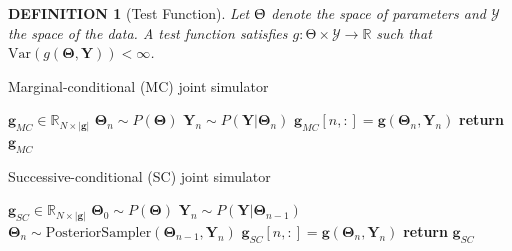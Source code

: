 \documentclass[a4paper,12pt]{article}
\newtheorem{definition}[theorem]{DEFINITION}
\newcommand{\var}{\mathrm{Var}}
\begin{document}
\begin{definition}[Test Function]
    Let $\mathbf{\Uptheta}$ denote the space of parameters and $\mathcal{Y}$ the space of the data. A test function satisfies $g:\mathrm{\Theta} \times \mathcal{Y} \rightarrow \mathbb{R}$ such that $\var(g(\mathbf{\Theta}, \mathbf{Y})) < \infty$. 
\end{definition}

\begin{algorithm}
    \centering
    \caption{Marginal-conditional (MC) joint simulator}\label{alg:mc-sampler}
    \begin{algorithmic}[1]
        \State {} $\mathbf{g}_{MC} \in \mathbb{R}_{N\times |\mathbf{g}|}$
            \State $\mathbf{\Theta}_{n} \sim P(\mathbf{\Theta})$ 
            \State $\mathbf{Y}_{n} \sim P(\mathbf{Y}|\mathbf{\Theta}_{n})$ 
            \State $\mathbf{g}_{MC}[n, :] = \mathbf{g}(\mathbf{\Theta}_{n}, \mathbf{Y}_{n})$ 
        \EndFor        
        \State \textbf{return} $\mathbf{g}_{MC}$
    \end{algorithmic}
\end{algorithm}

\begin{algorithm}
    \centering
    \caption{Successive-conditional (SC) joint simulator}\label{alg:sc-sampler}
    \begin{algorithmic}[1]
        \State {} $\mathbf{g}_{SC} \in \mathbb{R}_{N\times |\mathbf{g}|}$
        \State $\mathbf{\Theta}_{0} \sim P(\mathbf{\Theta})$ 
            \State $\mathbf{Y}_{n} \sim P(\mathbf{Y}|\mathbf{\Theta}_{n-1})$ 
            \State $\mathbf{\Theta}_{n} \sim \text{PosteriorSampler}(\mathbf{\Theta}_{n-1}, \mathbf{Y}_{n})$ 
            \State $\mathbf{g}_{SC}[n, :] = \mathbf{g}(\mathbf{\Theta}_{n}, \mathbf{Y}_{n})$ 
        \EndFor        
        \State \textbf{return} $\mathbf{g}_{SC}$
    \end{algorithmic}
\end{algorithm}
\end{document}

